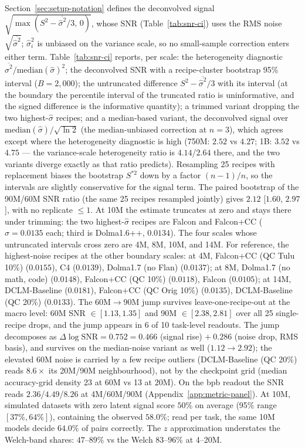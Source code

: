 Section~\ref{sec:setup-notation} defines the deconvolved signal
$\sqrt{\max(S^2 - \overline{\hat\sigma^2}/3,\,0)}$, whose SNR (Table~\ref{tab:snr-ci}) uses the
RMS noise $\sqrt{\overline{\hat\sigma^2}}$; $\hat\sigma_i^2$ is unbiased on the variance scale,
so no small-sample correction enters either term. Table~\ref{tab:snr-ci} reports, per scale:
the heterogeneity diagnostic $\overline{\hat\sigma^2}/\mathrm{median}(\hat\sigma)^2$; the
deconvolved SNR with a recipe-cluster bootstrap 95\% interval ($B = 2{,}000$); the untruncated
difference $S^2 - \overline{\hat\sigma^2}/3$ with its interval (at the boundary the percentile
interval of the truncated ratio is uninformative, and the signed difference is the informative
quantity); a trimmed variant dropping the two highest-$\hat\sigma$ recipes; and a median-based
variant, the deconvolved signal over $\mathrm{median}(\hat\sigma)/\sqrt{\ln 2}$ (the
median-unbiased correction at $n = 3$), which agrees except where the heterogeneity diagnostic
is high (750M: $2.52$ vs $4.27$; 1B: $3.52$ vs $4.75$ --- the variance-scale heterogeneity
ratio is
$4.14$/$2.64$ there, and the two variants diverge exactly as that ratio predicts). Resampling 25 recipes with
replacement biases the bootstrap $S^{*2}$ down by a factor $(n{-}1)/n$, so the intervals are
slightly conservative for the signal term. The paired bootstrap of the 90M/60M SNR ratio (the
same 25 recipes resampled jointly) gives $2.12$ [$1.60$, $2.97$], with no replicate $\le 1$.
At 10M the estimate truncates at zero and stays there under trimming: the two highest-$\hat\sigma$
recipes are Falcon and Falcon+CC ($\hat\sigma = 0.0135$ each; third is Dolma1.6++, $0.0134$).
The four scales whose untruncated intervals cross zero are 4M, 8M, 10M, and 14M. For reference,
the highest-noise recipes at the other boundary scales: at 4M, Falcon+CC (QC Tulu 10\%)
($0.0155$), C4 ($0.0139$), Dolma1.7 (no Flan) ($0.0137$); at 8M, Dolma1.7 (no math, code)
($0.0148$), Falcon+CC (QC 10\%) ($0.0118$), Falcon ($0.0105$); at 14M, DCLM-Baseline
($0.0181$), Falcon+CC (QC Orig 10\%) ($0.0135$), DCLM-Baseline (QC 20\%) ($0.0133$).
The 60M$\to$90M jump survives leave-one-recipe-out at the macro level: 60M SNR
$\in [1.13, 1.35]$ and 90M $\in [2.38, 2.81]$ over all 25 single-recipe drops, and the jump
appears in 6 of 10 task-level readouts. The jump decomposes as $\Delta\log\mathrm{SNR} =
0.752 = 0.466$ (signal rise) $+\ 0.286$ (noise drop, RMS basis), and survives on the
median-noise variant as well ($1.12 \to 2.92$); the elevated 60M noise is carried by a few recipe outliers
(DCLM-Baseline (QC 20\%) reads $8.6\times$ its 20M/90M neighbourhood), not by the checkpoint
grid (median accuracy-grid density 23 at 60M vs 13 at 20M). On the bpb readout the SNR reads
$2.36$/$4.49$/$8.26$ at 4M/60M/90M (Appendix~\ref{app:metric-panel}). At 10M, simulated
datasets with zero latent signal score $50\%$ on average (95\% range $[37\%, 64\%]$),
containing the observed $58.0\%$; read per task, the same 10M models decide $64.0\%$ of pairs
correctly. The $z$ approximation understates the Welch-band shares: $47$--$89\%$ vs the
Welch $83$--$96\%$ at 4--20M.

